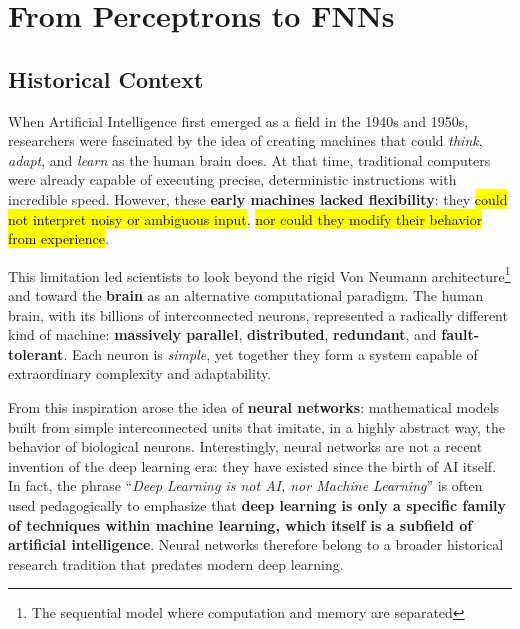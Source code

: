 \section{From Perceptrons to FNNs}

\subsection{Historical Context}

When Artificial Intelligence first emerged as a field in the 1940s and 1950s, researchers were fascinated by the idea of creating machines that could \emph{think}, \emph{adapt}, and \emph{learn} as the human brain does. At that time, traditional computers were already capable of executing precise, deterministic instructions with incredible speed. However, these \textbf{early machines lacked flexibility}: they \hl{could not interpret noisy or ambiguous input}, \hl{nor could they modify their behavior from experience}.

\highspace
This limitation led scientists to look beyond the rigid Von Neumann architecture\footnote{The sequential model where computation and memory are separated} and toward the \textbf{brain} as an alternative computational paradigm. The human brain, with its billions of interconnected neurons, represented a radically different kind of machine: \textbf{massively parallel}, \textbf{distributed}, \textbf{redundant}, and \textbf{fault-tolerant}. Each neuron is \emph{simple}, yet together they form a system capable of extraordinary complexity and adaptability.

\highspace
From this inspiration arose the idea of \textbf{neural networks}: mathematical models built from simple interconnected units that imitate, in a highly abstract way, the behavior of biological neurons. Interestingly, neural networks are not a recent invention of the deep learning era: they have existed since the birth of AI itself. In fact, the phrase ``\emph{Deep Learning is not AI, nor Machine Learning}'' is often used pedagogically to emphasize that \textbf{deep learning is only a specific family of techniques within machine learning, which itself is a subfield of artificial intelligence}. Neural networks therefore belong to a broader historical research tradition that predates modern deep learning.


